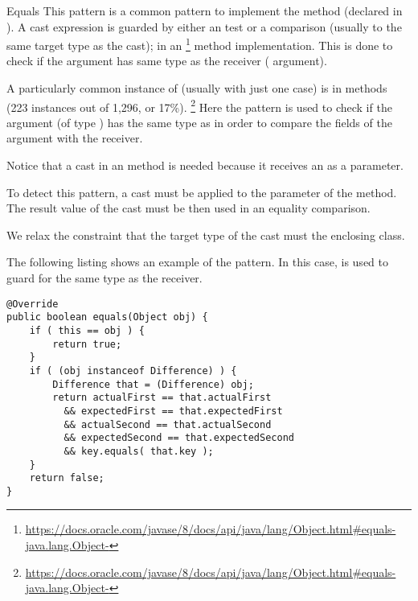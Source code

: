 \begin{pattern}{Equals}
This pattern is a common pattern to implement the  method (declared in ).
A cast expression is guarded by either an  test or a  comparison (usually to the same target type as the cast);
in an %
\footnote{\url{https://docs.oracle.com/javase/8/docs/api/java/lang/Object.html\#equals-java.lang.Object-}} method implementation.
This is done to check if the argument has same type as the receiver
( argument).


A particularly common instance of \thisp{} (usually with just one case) is in  methods (223
instances out of 1,296, or 17\%).%
\footnote{\url{https://docs.oracle.com/javase/8/docs/api/java/lang/Object.html\#equals-java.lang.Object-}}
Here the pattern is used to check if the argument (of type ) has the same type as 
in order to compare the fields of the argument with the receiver.



Notice that a cast in an  method is needed because it
receives an  as a parameter.




To detect this pattern,
a cast must be applied to the parameter of the  method.
The result value of the cast must be then used in an equality comparison.

We relax the constraint that the target type of the cast must the enclosing class.

\instances{}
The following listing%
\def\urlvar{http://bit.ly/neo4j_neo4j_2vJw94J}
shows an example of the \thisp{} pattern.
In this case,
 is used to guard for the same type as the receiver.

\begin{verbatim}
@Override
public boolean equals(Object obj) {
    if ( this == obj ) {
        return true;
    }
    if ( (obj instanceof Difference) ) {
        Difference that = (Difference) obj;
        return actualFirst == that.actualFirst
          && expectedFirst == that.expectedFirst
          && actualSecond == that.actualSecond 
          && expectedSecond == that.expectedSecond
          && key.equals( that.key );
    }
    return false;
}
\end{verbatim}


\end{pattern}
